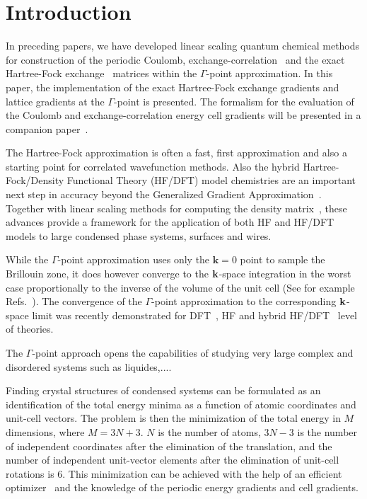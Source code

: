\documentclass[prl,twocolumn,showpacs,twocolumngrid,superbib]{revtex4}
\begin{document}
\section{Introduction}

In preceding papers, we have developed linear scaling quantum chemical methods
for construction of the periodic Coulomb, exchange-correlation~\cite{CTymczak04a}
and the exact Hartree-Fock exchange~\cite{CTymczak04b} 
matrices within the $\Gamma$-point approximation. 
In this paper, the implementation of the exact Hartree-Fock exchange
gradients and lattice gradients at the $\Gamma$-point is presented. 
The formalism for the evaluation of the Coulomb and 
exchange-correlation energy cell gradients will be presented 
in a companion paper~\cite{CTymczak05}.

The Hartree-Fock approximation is often a fast, first approximation and 
also a starting point for correlated wavefunction methods.
Also the hybrid Hartree-Fock/Density Functional Theory (HF/DFT) model chemistries
are an important next step in accuracy beyond the Generalized Gradient 
Approximation~\cite{Gill92,Becke93,VBarone96,CAdamo99}. Together with linear
scaling methods for computing the density matrix~\cite{ANiklasson02A,ANiklasson03}, these
advances provide a framework for the application of both HF and HF/DFT 
models to large condensed phase systems, surfaces and wires.

While the $\Gamma$-point approximation uses only the $\mathbf{k}=0$ point to sample
the Brillouin zone, it does however converge to the 
${\bf k}$-space integration in the worst case proportionally to the inverse of the volume of 
the unit cell (See for example Refs.~\cite{CKittel71,NAshcroft76}).
The convergence of the $\Gamma$-point approximation to 
the corresponding ${\bf k}$-space limit was recently 
demonstrated for DFT~\cite{CTymczak04a}, HF and hybrid 
HF/DFT~\cite{CTymczak04b} level of theories.

The $\Gamma$-point approach opens the capabilities of studying very large 
complex and disordered systems such as liquides,....

Finding crystal structures of condensed systems can
be formulated as an identification of the total energy minima
as a function of atomic coordinates and unit-cell vectors.
The problem is then the minimization of the total energy in $M$ dimensions, where
$M=3N+3$. $N$ is the number of atoms, $3N-3$ is the number
of independent coordinates after the elimination of the translation, 
and the number of independent unit-vector elements
after the elimination of unit-cell rotations is 6.
This minimization can be achieved with the help of an efficient optimizer~\cite{KNemeth04,KNemeth05}
and the knowledge of the periodic energy gradients and cell gradients. 
                                  
\end{document}
